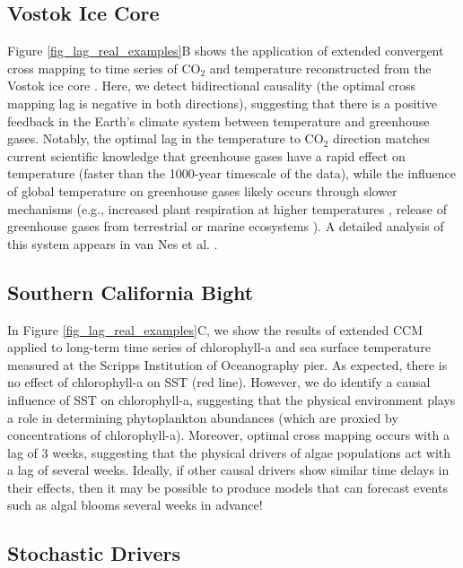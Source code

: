 \subsection{Vostok Ice Core}

Figure \ref{fig_lag_real_examples}B shows the application of extended convergent cross mapping to time series of CO$_2$ and temperature reconstructed from the Vostok ice core \cite{Petit_1999}. Here, we detect bidirectional causality (the optimal cross mapping lag is negative in both directions), suggesting that there is a positive feedback in the Earth's climate system between temperature and greenhouse gases. Notably, the optimal lag in the temperature to CO$_2$ direction matches current scientific knowledge that greenhouse gases have a rapid effect on temperature (faster than the 1000-year timescale of the data), while the influence of global temperature on greenhouse gases likely occurs through slower mechanisms (e.g., increased plant respiration at higher temperatures \cite{Cramer_2001}, release of greenhouse gases from terrestrial \cite{Schuur_2009} or marine ecosystems \cite{Archer_2009}). A detailed analysis of this system appears in van Nes et al. \cite{Nes_2015}.

\subsection{Southern California Bight}

In Figure \ref{fig_lag_real_examples}C, we show the results of extended CCM applied to long-term time series of chlorophyll-a and sea surface temperature measured at the Scripps Institution of Oceanography pier. As expected, there is no effect of chlorophyll-a on SST (red line). However, we do identify a causal influence of SST on chlorophyll-a, suggesting that the physical environment plays a role in determining phytoplankton abundances (which are proxied by concentrations of chlorophyll-a). Moreover, optimal cross mapping occurs with a lag of 3 weeks, suggesting that the physical drivers of algae populations act with a lag of several weeks. Ideally, if other causal drivers show similar time delays in their effects, then it may be possible to produce models that can forecast events such as algal blooms several weeks in advance!

\subsection{Stochastic Drivers}

